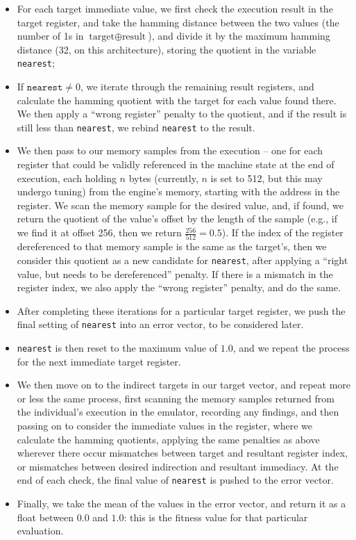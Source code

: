 \documentclass[12pt,glossary]{dalthesis}
\begin{document}
\begin{itemize}
\item For each target immediate value, we first check the execution result in the target register,
and take the hamming distance between the two values (the number of 1s in 
\(\text{target} \oplus \text{result}\)), and divide it by the maximum hamming distance
(32, on this architecture), storing the quotient in the variable \texttt{nearest};
\item If \(\texttt{nearest} \neq 0\), we iterate through the remaining result registers,
and calculate the hamming quotient with the target for each value found there. We
then apply a ``wrong register'' penalty to the quotient, and if the result is still
less than \texttt{nearest}, we rebind \texttt{nearest} to the result.
\item We then pass to our memory samples from the execution -- one for each register that
could be validly referenced in the machine state at the end of execution, each holding
\(n\) bytes (currently, \(n\) is set to 512, but this may undergo tuning) from the
engine's memory, starting with the address in the register. We scan the memory
sample for the desired value, and, if found, we return the quotient of the value's
offset by the length of the sample (e.g., if we find it at offset 256, then we
return \(\frac{256}{512} = 0.5\)). If the index of the register dereferenced to
that memory sample is the same as the target's, then we consider this quotient
as a new candidate for \texttt{nearest}, after applying a ``right value, but needs to be
dereferenced'' penalty. If there is a mismatch in the register index, we also 
apply the ``wrong register'' penalty, and do the same.
\item After completing these iterations for a particular target register, 
we push the final setting of \texttt{nearest} into an error vector, to be considered later.
\item \texttt{nearest} is then reset to the maximum value of \(1.0\), and we repeat the process for
the next immediate target register.

\item We then move on to the indirect targets in our target vector, and repeat more or
less the same process, first scanning the memory samples returned from the
individual's execution in the emulator, recording any findings, and then passing
on to consider the immediate values in the register, where we calculate the hamming
quotients, applying the same penalties as above wherever there occur mismatches 
between target and resultant register index, or mismatches between desired indirection
and resultant immediacy. At the end of each check, the final value of \texttt{nearest} is
pushed to the error vector.
\item Finally, we take the mean of the values in the error vector, and return it as a float
between \(0.0\) and \(1.0\): this is the fitness value for that particular evaluation.
\end{itemize}
\end{document}
